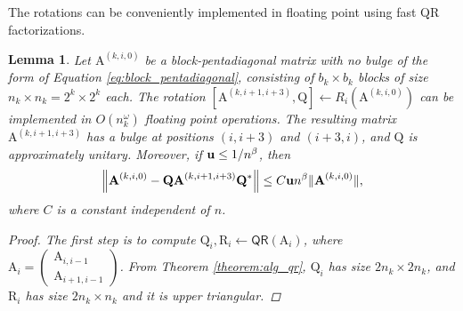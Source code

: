 \documentclass{article}
\newcommand{\lnorm}{\left\|}
\newcommand{\rnorm}{\right\|}
\newtheorem{lemma}{Lemma}[section]
\newcommand\matA{\boldsymbol{\mathrm{A}}}
\newcommand\matQ{\boldsymbol{\mathrm{Q}}}
\newcommand\matR{\boldsymbol{\mathrm{R}}}
\newcommand{\umach}{\textbf{\textup{u}}}
\newcommand{\QR}{\mathsf{QR}}
\newcommand{\cmm}{\beta}
\begin{document}
The rotations can be conveniently implemented in floating point using fast QR factorizations.

\begin{lemma}
    \label{lemma:rotation_r_i_floating_point}
    Let $\matA^{(k,i,0)}$ be a block-pentadiagonal matrix with no bulge of the form of Equation \eqref{eq:block_pentadiagonal}, consisting of $b_k\times b_k$ blocks of size $n_k\times n_k=2^{k}\times 2^{k}$ each. The rotation $[\matA^{(k,i+1,i+3)},\matQ] \leftarrow R_i(\matA^{(k,i,0)})$ can be implemented in $O(n_k^{\omega})$ floating point operations. The resulting matrix $\matA^{(k,i+1,i+3)}$ has a bulge at positions $(i,i+3)$ and $(i+3,i)$, and $\matQ$ is approximately unitary. Moreover, if $\umach\leq 1/n^{\cmm}$, then
    \begin{align*}
        \lnorm 
            \matA^{(k,i,0)} - \matQ\matA^{(k,i+1,i+3)} \matQ^*
        \rnorm
        \leq
        C\umach n^{\cmm}\|\matA^{(k,i,0)}\|,
    \end{align*}
    where $C$ is a constant independent of $n$.
    \begin{proof}
        The first step is to compute $\matQ_i,\matR_i\leftarrow \QR(\matA_i)$, where $\matA_i=\begin{pmatrix}
            \matA_{i,i-1}\\
            \matA_{i+1,i-1}
        \end{pmatrix}$. From Theorem \ref{theorem:alg_qr}, $\matQ_i$ has size $2n_k\times 2n_k$, and $\matR_i$ has size $2n_k\times n_k$ and it is upper triangular.
        

\end{proof}
\end{lemma}
\end{document}
